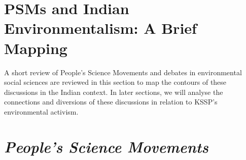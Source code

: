 \documentclass[twoside, 13pt]{article}
\begin{document}

{\fontsize{18}{20}\selectfont\section*{PSMs and Indian Environmentalism: A Brief Mapping}}

\vspace{-.4cm}

{\fontsize{12}{14}\selectfont A short review of People’s Science Movements and debates in environmental social sciences are reviewed in this section to map the contours of these discussions in the Indian context. In later sections, we will analyse the connections and diversions of these discussions in relation to KSSP’s environmental activism.} 


{\fontsize{18}{20}\selectfont\section*{\textit{People’s Science Movements}}}

\vspace{-.4cm}
\end{document}
